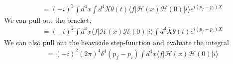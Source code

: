\documentclass[working, oneside]{../../Preambles/tuftebook}
\begin{document}
\begin{solution}
\begin{align*}
&= (-i)^2 \int d^4x \int d^4X \theta(t) \langle f | \mathcal{H}(x) \mathcal{H}(0) | i \rangle e^{i (p_f - p_i) X}
\end{align*}
We can pull out the bracket,
\begin{align*}
&= (-i)^2 \int d^4x \langle f | \mathcal{H}(x) \mathcal{H}(0) | i \rangle \int d^4\overline{X} \theta(t) e^{i (p_f - p_i) X}
\end{align*}
We can also pull out the heaviside step-function and evaluate the integral
\begin{align*}
&= (-i)^2 (2\pi)^4 \delta^4(p_f - p_i) \int d^4x \langle f | \mathcal{H}(x) \mathcal{H}(0) | i \rangle
\end{align*}
\end{solution}
\end{document}
